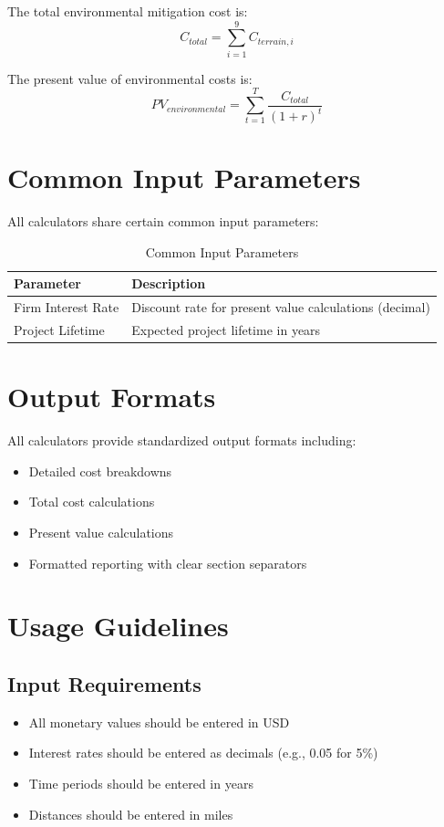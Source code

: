 \documentclass[12pt]{article}
\begin{document}
The total environmental mitigation cost is:
\begin{equation}
C_{total} = \sum_{i=1}^{9} C_{terrain,i}
\end{equation}

The present value of environmental costs is:
\begin{equation}
PV_{environmental} = \sum_{t=1}^{T} \frac{C_{total}}{(1 + r)^t}
\end{equation}

\section{Common Input Parameters}

All calculators share certain common input parameters:

\begin{table}[H]
\centering
\caption{Common Input Parameters}
\begin{tabular}{@{}ll@{}}
\toprule
\textbf{Parameter} & \textbf{Description} \\
\midrule
Firm Interest Rate & Discount rate for present value calculations (decimal) \\
Project Lifetime & Expected project lifetime in years \\
\bottomrule
\end{tabular}
\end{table}

\section{Output Formats}

All calculators provide standardized output formats including:
\begin{itemize}
    \item Detailed cost breakdowns
    \item Total cost calculations
    \item Present value calculations
    \item Formatted reporting with clear section separators
\end{itemize}

\section{Usage Guidelines}

\subsection{Input Requirements}
\begin{itemize}
    \item All monetary values should be entered in USD
    \item Interest rates should be entered as decimals (e.g., 0.05 for 5\%)
    \item Time periods should be entered in years
    \item Distances should be entered in miles
\end{itemize}
\end{document}

